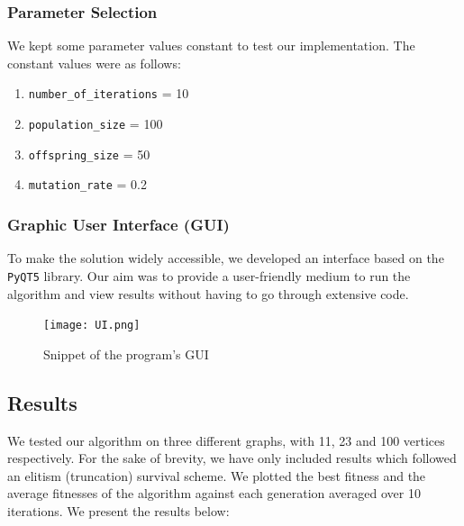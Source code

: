\documentclass[conference,compsoc]{IEEEtran}
\begin{document}
\subsubsection{Parameter Selection}  We kept some parameter values constant to test our implementation. The constant 
values were as follows:
\begin{enumerate}
  \item \texttt{number\_of\_iterations} = 10
  \item \texttt{population\_size} = 100
  \item \texttt{offspring\_size} = 50
  \item \texttt{mutation\_rate} = 0.2 
\end{enumerate}

\subsubsection{Graphic User Interface (GUI)} To make the solution widely accessible, we developed an interface 
based on the \texttt{PyQT5} library. Our aim was to provide a user-friendly medium to run the algorithm and 
view results without having to go through extensive code.
\begin{figure}[h]
    \centering
    \texttt{[image: UI.png]}
    \caption{Snippet of the program's GUI}
    \label{fig:my_label}
\end{figure}

\subsection{Results} \label{results}
We tested our algorithm on three different graphs, with 11, 23 and 100 vertices respectively. 
For the sake of brevity, we have only included results which followed an elitism (truncation) survival scheme. 
We plotted the best fitness and the average fitnesses of the algorithm against each generation 
averaged over 10 iterations. We present the results below:
\setlength{\parskip}{1 em}
\end{document}
